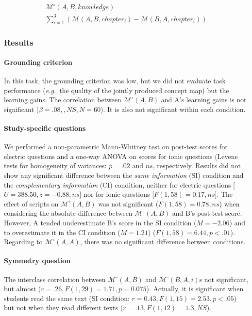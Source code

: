 \documentclass[twocolumn]{article}
\newcommand{\eg}{{\textit{e.g.\ }}}
\newcommand{\M}[3]{{\mathcal{M}(#1, #2, #3)}}
\newcommand{\Model}[3]{{$\mathcal{M}^{\circ}(#1, #2, #3)$}}
\newcommand{\gModel}[2]{{$\mathcal{M}^{\circ}(#1, #2)$}}
\newcommand{\Mdeg}[3]{{\mathcal{M}^{\circ}(#1, #2, #3)}}
\begin{document}
\begin{multline} \label{eq:study4.3}
    \Mdeg{A}{B}{knowledge} = \\
        \sum_{i=1}^{3}  (\M{A}{B}{chapter_i} - \M{B}{A}{chapter_i})
\end{multline}

\subsubsection*{Results}

\paragraph{Grounding criterion} In this task, the grounding criterion was low,
but we did not evaluate task performance (\eg the quality of the jointly
produced concept map) but the learning gains. The correlation between
\gModel{A}{B} and A's learning gains is not significant ($\beta =.08, ,NS, N =
60$). It is also not significant within each condition.

\paragraph{Study-specific questions} We performed a non-parametric Mann-Whitney
test on post-test scores for electric questions and a one-way ANOVA on scores
for ionic questions (Levene tests for homogeneity of variances: $p = .02$ and
$ns$, respectively. Results  did not show any significant difference between the
\emph{same information} (SI) condition and the \emph{complementary information}
(CI) condition, neither for electric questions [$U = 388.50, z = -0.88, ns$] nor
for ionic questions [$F(1, 58) = 0.17, ns$].  The effect of scripts on
\gModel{A}{B} was not significant ($F(1, 58) = 0.78, ns$) when considering the
absolute difference between \gModel{A}{B} and B's post-test score. However, A
tended underestimate B's score in the SI condition ($M = -2.06$) and to
overestimate it in the CI condition ($M = 1.21$) ($F(1, 58) = 6.44, p<.01$).
Regarding to \gModel{A}{A}, there was no significant difference between
conditions.

\paragraph{Symmetry question} The interclass correlation between \gModel{A}{B}
and \Model{B}{A} is not significant, but almost ($r=.26, F(1,29)=1.71, p=
0.075$).  Actually, it is significant when students read the same text (SI
condition: $r=0.43, F(1,15)=2.53, p<.05$) but not when they read different texts
($r=.13, F(1,12)=1.3, NS$). 
\end{document}
